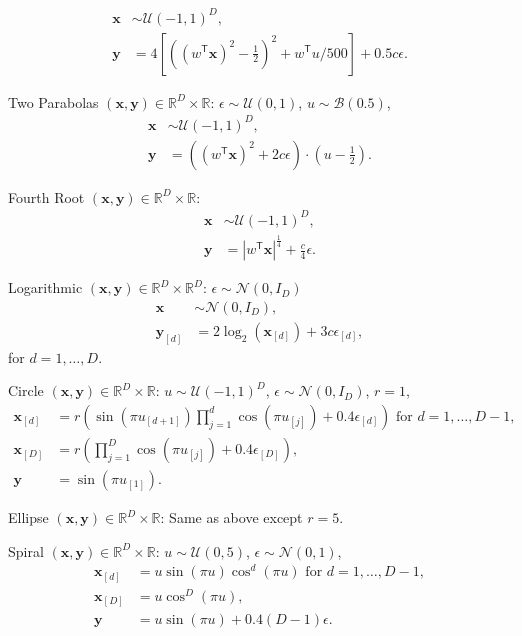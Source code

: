 \documentclass[11pt]{article}
\providecommand{\mb}[1]{\boldsymbol{#1}}
\providecommand{\mc}[1]{\mathcal{#1}}
\newcommand{\Real}{\mathbb{R}}
\newcommand{\T}{^{\ensuremath{\mathsf{T}}}}           %
\begin{document}
\begin{compactenum}
\begin{align*}
\mb{x} &\sim \mc{U}(-1,1)^{D},\\
\mb{y}&=4\left[ \left( (w\T \mb{x})^2 - \tfrac{1}{2} \right)^2 + w\T u/500 \right]+0.5c\epsilon.
\end{align*}
\item Two Parabolas $(\mb{x},\mb{y}) \in \Real^{D} \times \Real$: $\epsilon \sim \mc{U}(0,1)$, $u \sim \mc{B}(0.5)$,
\begin{align*}
\mb{x} &\sim \mc{U}(-1,1)^{D},\\
\mb{y}&=\left( (w\T \mb{x})^2  + 2c\epsilon\right) \cdot (u-\tfrac{1}{2}).
\end{align*}
\item Fourth Root $(\mb{x},\mb{y}) \in \Real^{D} \times \Real$:
\begin{align*}
\mb{x} &\sim \mc{U}(-1,1)^{D},\\
\mb{y}&=|w\T \mb{x}|^\frac{1}{4}+\frac{c}{4}\epsilon.
\end{align*}
\item Logarithmic $(\mb{x},\mb{y}) \in \Real^{D} \times \Real^{D}$: $\epsilon \sim \mc{N}(0, I_{D})$
\begin{align*}
\mb{x} &\sim \mc{N}(0, I_{D}),\\
\mb{y}_{[d]}&=2\log_{2}(\mb{x}_{[d]})+3c\epsilon_{[d]},
\end{align*}
for $d=1,\ldots,D$.
\item Circle $(\mb{x},\mb{y}) \in \Real^{D} \times \Real$: $u \sim \mc{U}(-1,1)^{D}$, $\epsilon \sim \mc{N}(0, I_{D})$, $r=1$,
\begin{align*}
\mb{x}_{[d]}&=r \left(\sin(\pi u_{[d+1]})  \prod_{j=1}^{d} \cos(\pi u_{[j]})+0.4 \epsilon_{[d]}\right) \mbox{ for $d=1,\ldots,D-1$},\\
\mb{x}_{[D]}&=r \left(\prod_{j=1}^{D} \cos(\pi u_{[j]})+0.4 \epsilon_{[D]}\right),\\
\mb{y}&= \sin(\pi u_{[1]}).
\end{align*}
\item Ellipse $(\mb{x},\mb{y}) \in \Real^{D} \times \Real$: Same as above except $r=5$.

\item Spiral $(\mb{x},\mb{y}) \in \Real^{D} \times \Real$: $u \sim \mc{U}(0,5)$, $\epsilon \sim \mc{N}(0, 1)$,
\begin{align*}
\mb{x}_{[d]}&=u \sin(\pi u)  \cos^{d}(\pi u) \mbox{ for $d=1,\ldots,D-1$},\\
\mb{x}_{[D]}&=u \cos^{D}(\pi u),\\
\mb{y}&= u \sin(\pi u) +0.4 (D-1)\epsilon.
\end{align*}


\end{compactenum}
\end{document}
